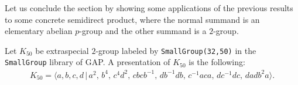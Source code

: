 \documentclass[a4paper, english, 9pt]{amsart}
\theoremstyle{plain}
\theoremstyle{definition}
\def\Z{\mathbb Z}
\begin{document}
%
%
Let us conclude the section by showing some applications of the previous results to some concrete semidirect product, where the normal summand is an elementary abelian $p$-group and the other summand is a $2$-group.

Let $K_{50}$ be extraspecial $2$-group labeled by {\tt SmallGroup(32,50)} in the {\tt SmallGroup} library of GAP. A presentation of $K_{50}$ is the following:
\begin{align*}
    K_{50}=\langle a,b,c,d\,|\,a^2,\,b^4,\,c^4 d^2,\, cbcb^{-1},\,db^{-1}db,\,c^{-1}aca,\,dc^{-1}dc,\,dadb^2a\rangle.
\end{align*}
\end{document}
